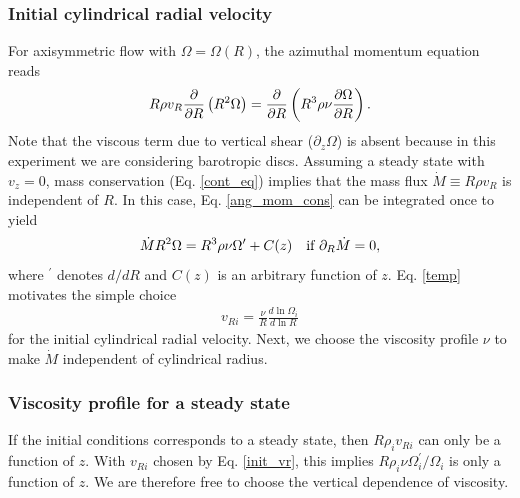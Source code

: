\subsubsection{Initial cylindrical radial velocity}
For axisymmetric flow with $\Omega=\Omega(R)$, the azimuthal momentum
equation reads  
\begin{align}\label{ang_mom_cons}
  R\rho v_R\frac{\partial}{\partial R}\left(R^2\Omega \right) = \frac{\partial}{\partial
    R}\left(R^3\rho\nu\frac{\partial\Omega}{\partial R}\right). 
\end{align}
Note that the viscous term due to vertical shear ($\partial_z\Omega$) 
is absent because in this experiment we are considering barotropic
discs. Assuming a steady state with $v_z=0$, mass
conservation (Eq. \ref{cont_eq}) implies that the mass flux  
$\dot{M}\equiv R\rho v_R$ is independent of $R$. In this case,
Eq. \ref{ang_mom_cons} can 
be integrated once to yield 
\begin{align}\label{temp}
  \dot{M}R^2\Omega = R^3\rho\nu\Omega^\prime + C(z) \quad \text{if $\partial_R\dot{M}$} = 0, 
\end{align}
where $^\prime$ denotes $d/dR$ and $C(z)$ is an arbitrary function of
$z$. Eq. \ref{temp} motivates the simple choice
\begin{align}\label{init_vr} 
  v_{Ri} = \frac{\nu}{R}\frac{d\ln{\Omega_i}}{d\ln{R}} 
\end{align}
for the initial cylindrical radial velocity. Next, we choose the
viscosity profile $\nu$ to make $\dot{M}$ independent of
cylindrical radius.  

\subsubsection{Viscosity profile for a steady state}\label{visc_model}
If the initial conditions corresponds to a steady state, then
$R \rho_i v_{Ri}$ can only be a function of $z$. With $v_{Ri}$ chosen
by Eq. \ref{init_vr}, this implies 
$R\rho_i\nu\Omega_i^\prime/\Omega_i$ is only a function of $z$. We are
therefore free to choose the vertical dependence of viscosity.   


